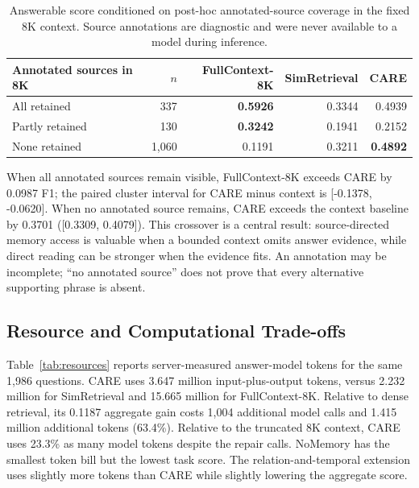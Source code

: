 \documentclass[11pt]{article}
\newcommand{\care}{\textsc{CARE}}
\begin{document}
\begin{table}[t]
\centering
\caption{Answerable score conditioned on post-hoc annotated-source
coverage in the fixed 8K context. Source annotations are diagnostic and
were never available to a model during inference.}
\label{tab:coverage}
\small
\begin{tabular}{lrrrr}
\toprule
Annotated sources in 8K & $n$ & FullContext-8K & SimRetrieval & \care{} \\
\midrule
All retained & 337 & \textbf{0.5926} & 0.3344 & 0.4939 \\
Partly retained & 130 & \textbf{0.3242} & 0.1941 & 0.2152 \\
None retained & 1,060 & 0.1191 & 0.3211 & \textbf{0.4892} \\
\bottomrule
\end{tabular}
\end{table}

When all annotated sources remain visible, FullContext-8K exceeds \care{}
by 0.0987 F1; the paired cluster interval for \care{} minus context is
[-0.1378, -0.0620]. When no annotated source remains, \care{} exceeds the
context baseline by 0.3701 ([0.3309, 0.4079]). This crossover is a central
result: source-directed memory access is valuable when a bounded context
omits answer evidence, while direct reading can be stronger when the
evidence fits. An annotation may be incomplete; ``no annotated source''
does not prove that every alternative supporting phrase is absent.

\subsection{Resource and Computational Trade-offs}
\label{sec:resources}

Table~\ref{tab:resources} reports server-measured answer-model tokens for
the same 1,986 questions. \care{} uses 3.647 million input-plus-output
tokens, versus 2.232 million for SimRetrieval and 15.665 million for
FullContext-8K. Relative to dense retrieval, its 0.1187 aggregate gain
costs 1,004 additional model calls and 1.415 million additional tokens
(63.4\%). Relative to the truncated 8K context, \care{} uses 23.3\% as many
model tokens despite the repair calls. NoMemory has the smallest token bill
but the lowest task score. The relation-and-temporal extension uses slightly
more tokens than \care{} while slightly lowering the aggregate score.
\end{document}
